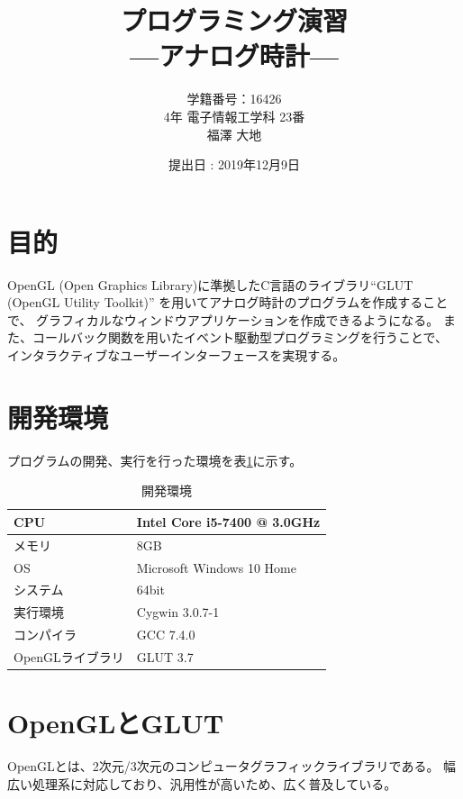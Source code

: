 \documentclass[a4j,titlepage]{jsarticle}
\begin{document}
\begin{titlepage}
  \title{\huge{プログラミング演習} \\ \LARGE{---アナログ時計---}}
	\author{学籍番号：16426 \\ 4年 電子情報工学科 23番 \\ 福澤 大地}
	\date{提出日 : 2019年12月9日}
  \maketitle
\end{titlepage}


\section{目的}
OpenGL (Open Graphics Library)に準拠したC言語のライブラリ``GLUT (OpenGL Utility Toolkit)''
を用いてアナログ時計のプログラムを作成することで、
グラフィカルなウィンドウアプリケーションを作成できるようになる。
また、コールバック関数を用いたイベント駆動型プログラミングを行うことで、
インタラクティブなユーザーインターフェースを実現する。


\section{開発環境}
プログラムの開発、実行を行った環境を表\ref{tb:kan}に示す。

\begin{table}[H]
  \centering
  \caption{開発環境}
  \label{tb:kan}

  \begin{tabular}{|l|l|}
    \hline
    CPU & Intel Core i5-7400 @ 3.0GHz \\ \hline
    メモリ & 8GB \\ \hline
    OS & Microsoft Windows 10 Home \\ \hline
    システム & 64bit \\ \hline
    実行環境 & Cygwin 3.0.7-1 \\ \hline
    コンパイラ & GCC 7.4.0 \\ \hline
    OpenGLライブラリ & GLUT 3.7 \\ \hline
  \end{tabular}
\end{table}


\section{OpenGLとGLUT \cite{bib:1}}
OpenGLとは、2次元/3次元のコンピュータグラフィックライブラリである。
幅広い処理系に対応しており、汎用性が高いため、広く普及している。
\end{document}
